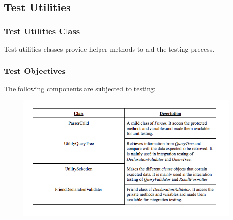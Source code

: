 \documentclass[12pt]{article}
\begin{document}
{{{{{{{{{{\subsection{Test Utilities}
\subsubsection{Test Utilities Class}
Test utilities classes provide helper methods to aid the testing process.
\subsubsection{Test Objectives}
The following components are subjected to testing: 
\begin{figure}[!htbp]
  \centering 
 \includegraphics[width=1.1\textwidth]{Test_utilities.png}
\end{figure}
}}}}}}}}}}
\end{document}
